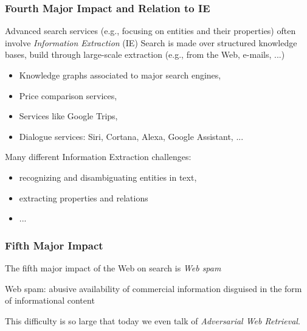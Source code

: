 \documentclass[svgnames]{beamer}
\begin{document}
\begin{frame}
    \frametitle{Fourth Major Impact and Relation to IE}
    Advanced search services (e.g., focusing on entities and their properties) often involve \emph{Information Extraction} (IE)
    \vfill
    Search is made over structured knowledge bases, build through large-scale extraction (e.g., from the Web, e-mails, ...)
    \begin{itemize}
    \item Knowledge graphs associated to major search engines,
    \item Price comparison services,
    \item Services like Google Trips,
    \item Dialogue services: Siri, Cortana, Alexa, Google Assistant, ...
    \end{itemize}
    \vfill
    Many different Information Extraction challenges:
    \begin{itemize}
    \item recognizing and disambiguating entities in text,
    \item extracting properties and relations
    \item ...
    \end{itemize}
\end{frame}

\begin{frame}
    \frametitle{Fifth Major Impact}

    The fifth major impact of the Web on search is \emph{Web spam}

    \begin{block}{Web spam:} 
        abusive availability of commercial information disguised in the form of informational content
    \end{block}

    \vfill

    \begin{block}{}
        This difficulty is so large that today we even talk of \emph{Adversarial Web Retrieval}.
    \end{block}

\end{frame}
\end{document}
